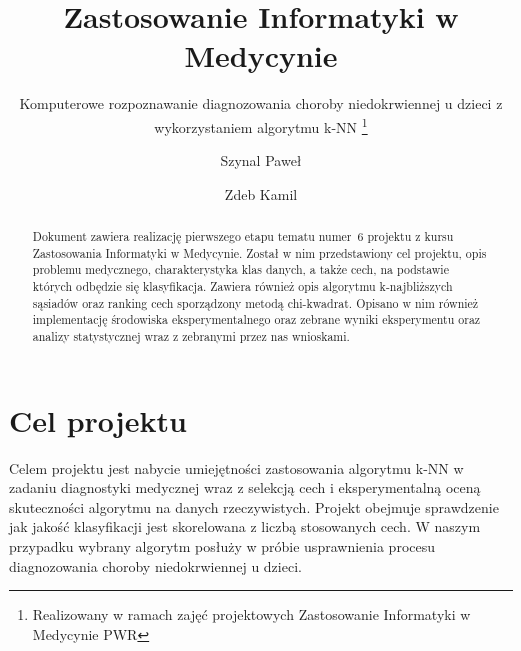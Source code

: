\documentclass[runningheads]{llncs}
\begin{document}
%
\title{Zastosowanie Informatyki w Medycynie}
\vspace{20mm}
\subtitle{Komputerowe rozpoznawanie diagnozowania choroby niedokrwiennej u dzieci z wykorzystaniem algorytmu k-NN \thanks{Realizowany w ramach zajęć projektowych Zastosowanie Informatyki w Medycynie PWR}}
%
%
\author{Szynal Paweł \and
Zdeb Kamil  }
%
%
%
\maketitle              %
%
\begin{abstract}
Dokument zawiera realizację pierwszego etapu tematu numer~6 projektu z kursu Zastosowania Informatyki w Medycynie. Został w nim przedstawiony cel projektu, opis problemu medycznego, charakterystyka klas danych, a także cech, na podstawie których odbędzie się klasyfikacja. Zawiera również opis algorytmu k-najbliższych sąsiadów oraz ranking cech sporządzony metodą chi-kwadrat. Opisano w nim również implementację środowiska eksperymentalnego oraz zebrane wyniki eksperymentu oraz analizy statystycznej wraz z zebranymi przez nas wnioskami.

\end{abstract}

\section{Cel projektu}

Celem projektu jest nabycie umiejętności zastosowania algorytmu k-NN w zadaniu diagnostyki medycznej wraz z selekcją cech i eksperymentalną oceną skuteczności algorytmu na danych rzeczywistych. Projekt obejmuje sprawdzenie jak jakość klasyfikacji jest skorelowana z liczbą stosowanych cech. W naszym przypadku wybrany algorytm posłuży w próbie usprawnienia procesu diagnozowania choroby niedokrwiennej u dzieci.


\end{document}
